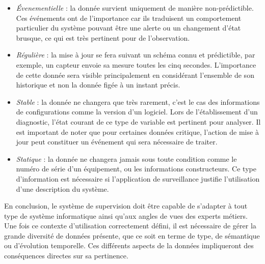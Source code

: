 \begin{itemize}
    \begin{itemize} 
        \item \textit{Évenementielle} : la donnée survient uniquement de manière non-prédictible. Ces événements ont de l'importance car ils traduisent un comportement particulier du système pouvant être une alerte ou un changement d'état brusque, ce qui est très pertinent pour de l'observation.
        \item \textit{Régulière} : la mise à jour se fera suivant un schéma connu et prédictible, par exemple, un capteur envoie sa mesure toutes les cinq secondes. L'importance de cette donnée sera visible principalement en considérant l'ensemble de son historique et non la donnée figée à un instant précis.
        \item \textit{Stable} : la donnée ne changera que très rarement, c'est le cas des informations de configurations comme la version d'un logiciel. Lors de l'établissement d'un diagnostic, l'état courant de ce type de variable est pertinent pour analyser. Il est important de noter que pour certaines données critique, l'action de mise à jour peut constituer un événement qui sera nécessaire de traiter.
        \item \textit{Statique} : la donnée ne changera jamais sous toute condition comme le numéro de série d'un équipement, ou les informations constructeurs. Ce type d'information est nécessaire si l'application de surveillance justifie l'utilisation d'une description du système.
    \end{itemize}
\end{itemize}

En conclusion, le système de supervision doit être capable de s'adapter à tout type de système informatique ainsi qu'aux angles de vues des experts métiers. Une fois ce contexte d'utilisation correctement défini, il est nécessaire de gérer la grande diversité de données présente, que ce soit en terme de type, de sémantique ou d'évolution temporelle. Ces différents aspects de la données impliqueront des conséquences directes sur sa pertinence.
